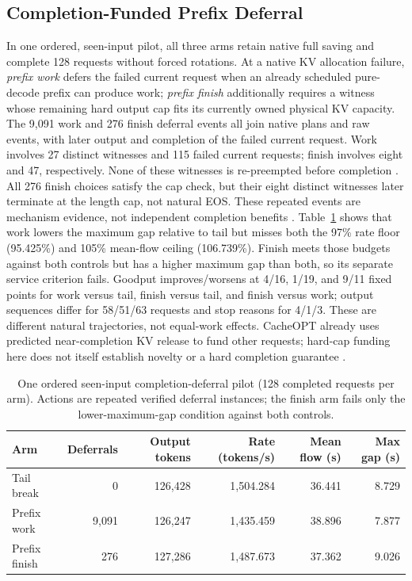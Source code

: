 \documentclass[10pt]{article}
\begin{document}
\subsection{Completion-Funded Prefix Deferral}
In one ordered, seen-input pilot, all three arms retain native full saving and complete 128 requests without forced rotations. At a native KV allocation failure, \emph{prefix work} defers the failed current request when an already scheduled pure-decode prefix can produce work; \emph{prefix finish} additionally requires a witness whose remaining hard output cap fits its currently owned physical KV capacity. The 9,091 work and 276 finish deferral events all join native plans and raw events, with later output and completion of the failed current request. Work involves 27 distinct witnesses and 115 failed current requests; finish involves eight and 47, respectively. None of these witnesses is re-preempted before completion \cite{completiongroups}. All 276 finish choices satisfy the cap check, but their eight distinct witnesses later terminate at the length cap, not natural EOS. These repeated events are mechanism evidence, not independent completion benefits \cite{completiondeferral}. Table~\ref{tab:completiondeferral} shows that work lowers the maximum gap relative to tail but misses both the 97\% rate floor (95.425\%) and 105\% mean-flow ceiling (106.739\%). Finish meets those budgets against both controls but has a higher maximum gap than both, so its separate service criterion fails. Goodput improves/worsens at 4/16, 1/19, and 9/11 fixed points for work versus tail, finish versus tail, and finish versus work; output sequences differ for 58/51/63 requests and stop reasons for 4/1/3. These are different natural trajectories, not equal-work effects. CacheOPT already uses predicted near-completion KV release to fund other requests; hard-cap funding here does not itself establish novelty or a hard completion guarantee \cite{cacheopt}.

\begin{table}[h]
\centering\small
\caption{One ordered seen-input completion-deferral pilot (128 completed requests per arm). Actions are repeated verified deferral instances; the finish arm fails only the lower-maximum-gap condition against both controls.}
\label{tab:completiondeferral}
\begin{tabular}{lrrrrr}
\toprule
Arm & Deferrals & Output tokens & Rate (tokens/s) & Mean flow (s) & Max gap (s) \\
\midrule
Tail break & 0 & 126,428 & 1,504.284 & 36.441 & 8.729 \\
Prefix work & 9,091 & 126,247 & 1,435.459 & 38.896 & 7.877 \\
Prefix finish & 276 & 127,286 & 1,487.673 & 37.362 & 9.026 \\
\bottomrule
\end{tabular}
\end{table}
\end{document}
